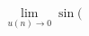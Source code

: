 \documentclass[preview]{standalone}
\begin{document}
\begin{align*}
\lim_{u(n) \to 0} \sin \big(
\end{align*}
\end{document}
